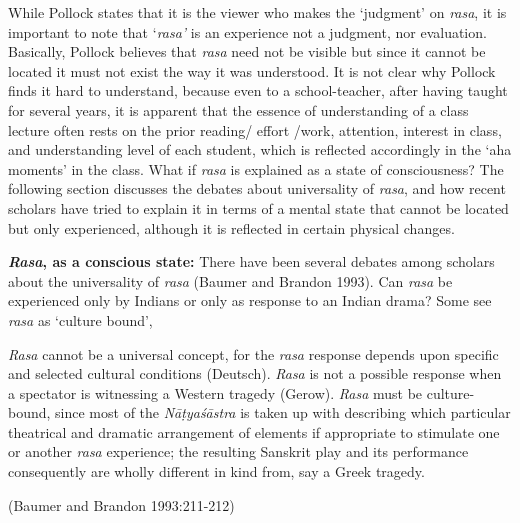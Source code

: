 While Pollock states that it is the viewer who makes the ‘judgment’ on \textsl{rasa}, it is important to note that ‘\textsl{rasa’} is an experience not a judgment, nor evaluation.  Basically, Pollock believes that \textsl{rasa} need not be visible but since it cannot be located it must not exist the way it was understood. It is not clear why Pollock finds it hard to understand, because even to a school-teacher, after having taught for several years, it is apparent that the essence of understanding of a class lecture often rests on the prior reading/ effort /work, attention, interest in class, and understanding level of each student, which is reflected accordingly in the ‘aha moments’ in the class. What if \textsl{rasa} is explained as a state of consciousness? The following section discusses the debates about universality of \textsl{rasa}, and how recent scholars have tried to explain it in terms of a mental state that cannot be located but only experienced, although it is reflected in certain physical changes. 

\textbf{\textsl{Rasa}, as a conscious state:} There have been several debates among scholars about the universality of \textsl{rasa} (Baumer and Brandon 1993). Can \textsl{rasa} be experienced only by Indians or only as response to an Indian drama? Some see \textsl{rasa} as ‘culture bound’, 

\begin{myquote}
\textsl{Rasa} cannot be a universal concept, for the \textsl{rasa} response depends upon specific and selected cultural conditions (Deutsch). \textsl{Rasa} is not a possible response when a spectator is witnessing a Western tragedy (Gerow). \textsl{Rasa} must be culture-bound, since most of the \textsl{Nāṭyaśāstra} is taken up with describing which particular theatrical and dramatic arrangement of elements if appropriate to stimulate one or another \textsl{rasa} experience; the resulting Sanskrit play and its performance consequently are wholly different in kind from, say a Greek tragedy. 

\hfill (Baumer and Brandon 1993:211-212)
\end{myquote}


